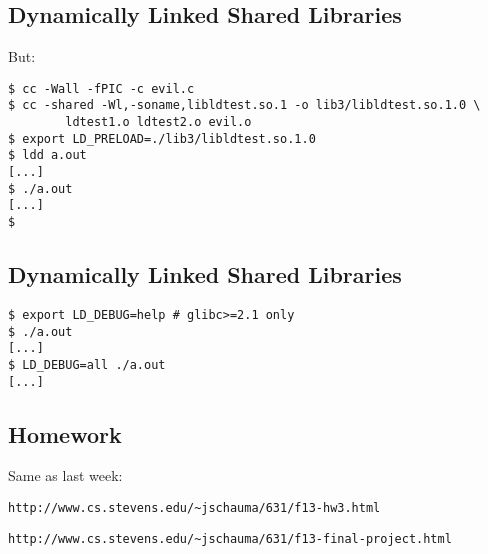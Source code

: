 \documentclass[xga]{xdvislides}
\begin{document}
\subsection{Dynamically Linked Shared Libraries}
But:
\begin{verbatim}
$ cc -Wall -fPIC -c evil.c
$ cc -shared -Wl,-soname,libldtest.so.1 -o lib3/libldtest.so.1.0 \
        ldtest1.o ldtest2.o evil.o
$ export LD_PRELOAD=./lib3/libldtest.so.1.0
$ ldd a.out
[...]
$ ./a.out
[...]
$
\end{verbatim}

\subsection{Dynamically Linked Shared Libraries}
\begin{verbatim}
$ export LD_DEBUG=help # glibc>=2.1 only
$ ./a.out
[...]
$ LD_DEBUG=all ./a.out
[...]
\end{verbatim}

\subsection{Homework}
Same as last week:

\verb+http://www.cs.stevens.edu/~jschauma/631/f13-hw3.html+

\verb+http://www.cs.stevens.edu/~jschauma/631/f13-final-project.html+
\end{document}
